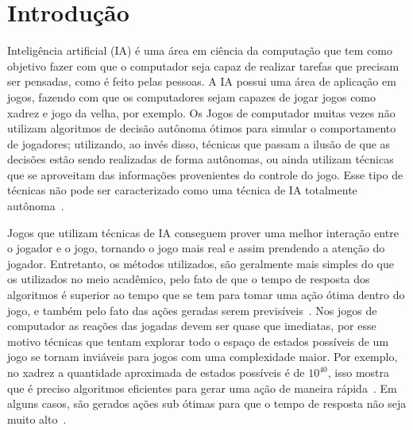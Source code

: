 \chapter{\label{chap:intro}Introdução}

Inteligência artificial (IA) é uma área em ciência da computação que tem como objetivo fazer com que o computador seja capaz de realizar tarefas que precisam ser pensadas, como é feito pelas pessoas.  
A IA possui uma área de aplicação  em jogos, fazendo com que os computadores sejam capazes de jogar jogos como xadrez e jogo da velha, por exemplo. 
Os Jogos de computador muitas vezes não utilizam algoritmos de decisão autônoma ótimos para simular o comportamento de jogadores; utilizando, ao invés disso, técnicas que passam a ilusão de que as decisões estão sendo realizadas de forma autônomas, ou ainda utilizam técnicas que se aproveitam das informações provenientes do controle do jogo. Esse tipo de técnicas não pode ser caracterizado como uma técnica de IA totalmente autônoma~\cite{millington2009artificial}.

Jogos que utilizam técnicas de IA conseguem prover uma melhor interação entre o jogador e o jogo, tornando o jogo mais real e assim prendendo a atenção do jogador.
Entretanto, os métodos utilizados, são geralmente mais simples do que os utilizados no meio acadêmico, pelo fato de que o tempo de resposta dos algoritmos é superior ao tempo que se tem para tomar uma ação ótima dentro do jogo, e também pelo fato das ações geradas serem previsíveis~\cite{millington2009artificial}.
Nos jogos de computador as reações das jogadas devem ser quase que imediatas, por esse motivo técnicas que tentam explorar todo o espaço de estados possíveis de um jogo se tornam inviáveis para jogos com uma complexidade maior.
Por exemplo, no xadrez a quantidade aproximada de estados possíveis é de $10^{40}$, isso mostra que é preciso algoritmos eficientes para gerar uma ação de maneira rápida~\cite{millington2009artificial}. 
Em alguns casos, são gerados ações sub ótimas para que o tempo de resposta não seja muito alto~\cite[Capítulo 3]{intelligence2003modern}. 

